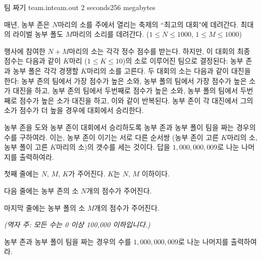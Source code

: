 \begin{problem}{팀 짜기}
	{team.in}{team.out}
	{2 seconds}{256 megabytes}{}
	
	매년, 농부 존은 $N$마리의 소를 주에서 열리는 축제의 ``최고의 대회"에 데려간다. 최대의 라이벌 농부 폴도 $M$마리의 소리를 데려간다. ($1 \le N \le 1000$, $1 \le M \le 1000$)
	
	행사에 참여한 $N+M$마리의 소는 각각 정수 점수를 받는다. 하지만, 이 대회의 최종 점수는 다음과 같이 $K$마리 ($1 \le K \le 10$)의 소로 이루어진 팀으로 결정된다: 농부 존과 농부 폴은 각각 경쟁할 $K$마리의 소를 고른다. 두 대회의 소는 다음과 같이 대진을 한다: 농부 존의 팀에서 가장 점수가 높은 소와, 농부 폴의 팀에서 가장 점수가 높은 소가 대진을 하고, 농부 존의 팀에서 두번째로 점수가 높은 소와, 농부 폴의 팀에서 두번째로 점수가 높은 소가 대진을 하고, 이와 같이 반복된다. 농부 존이 각 대진에서 그의 소가 점수가 더 높을 경우에 대회에서 승리한다.
	
	농부 존을 도와 농부 존이 대회에서 승리하도록 농부 존과 농부 폴이 팀을 짜는 경우의 수를 구하여라. 이는, 농부 존이 이기는 서로 다른 순서쌍 (농부 존이 고른 $K$마리의 소, 농부 폴이 고른 $K$마리의 소)의 갯수를 세는 것이다. 답을 $1,000,000,009$로 나눈 나머지를 출력하여라.
	


	
	\InputFile
	
	첫째 줄에는 $N$, $M$, $K$가 주어진다. $K$는 $N$, $M$ 이하이다.
	
	다음 줄에는 농부 존의 소 $N$개의 점수가 주어진다.
	
	마지막 줄에는 농부 폴의 소 $M$개의 점수가 주어진다.
	
	\textit{(역자 주: 모든 수는 0 이상 100,000 이하입니다.)}

	\OutputFile
	
	농부 존과 농부 폴이 팀을 짜는 경우의 수를 $1,000,000,009$로 나눈 나머지를 출력하여라.
	
	\Examples
		
	\begin{example}
	\end{example}

	
	
	
\end{problem}

